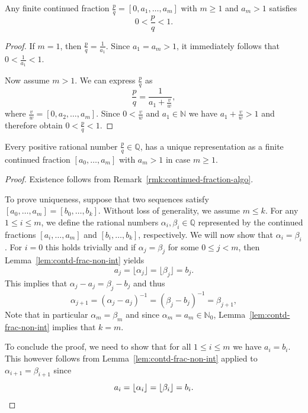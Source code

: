 \documentclass[a4paper, oneside, 12pt]{amsart}
\begin{document}
\begin{lemma}\label{lem:contd-frac-non-int}
  Any finite continued fraction \(\frac{p}{q} =[0, a_1, \dots , a_{m}]\) with \(m \geq 1\) and \(a_{m}>1\) satisfies
  \begin{equation*}
    0 < \frac{p}{q} < 1.
  \end{equation*}
\end{lemma}
\begin{proof}
  If \(m=1\), then \(\frac{p}{q} = \frac{1}{a_1}\).
  Since \(a_1 = a_m > 1\), it immediately follows that \(0 < \frac{1}{a_1} < 1\).

  Now assume \(m > 1\).
  We can express \(\frac{p}{q}\) as
  \begin{equation*}
    \frac{p}{q} = \frac{1}{a_{1} + \frac{v}{w}},
  \end{equation*}
  where \(\frac{v}{w} = [0, a_2, \dots, a_m]\).
  Since \(0 < \frac{v}{w}\) and \(a_{1}\in \mathbb{N}\) we have  \(a_{1}+ \frac{v}{w} > 1\) and therefore obtain \(0 <\frac{p}{q}< 1\).
\end{proof}


\begin{theorem}\label{thm:existence-and-uniqueness}
  Every positive rational number \(\frac{p}{q} \in \mathbb{Q}\), has a unique representation as a  finite continued fraction \([a_{0}, \dots , a_{m}]\)  with \(a_m > 1\) in case \(m \geq 1\).
\end{theorem}
\begin{proof}
  Existence follows from Remark~\ref{rmk:continued-fraction-algo}.

  To prove uniqueness, suppose that two sequences satisfy \([a_0, \dots, a_m] = [b_0, \dots, b_k]\).
  Without loss of generality, we assume \(m \leq k\).
  For any \(1\leq i\leq m\), we define the rational numbers \(\alpha_{i}, \beta_{i}\in \mathbb{Q}\) represented by the continued fractions  \([a_i, \dots, a_m]\) and \( [b_i, \dots, b_k]\), respectively.
  We will now show  that  \(\alpha_i = \beta_i\).
  For \(i=0\) this holds trivially and if \(\alpha_j = \beta_j\) for some \(0\leq j <m\), then Lemma~\ref{lem:contd-frac-non-int} yields
  \begin{equation*}
    a_j = \lfloor \alpha_j \rfloor = \lfloor \beta_j \rfloor = b_j.
  \end{equation*}
  This implies that \(\alpha_j - a_j = \beta_j - b_j\) and thus
  \begin{equation*}
    \alpha_{j+1} = (\alpha_j - a_j)^{-1} = (\beta_j - b_j)^{-1} = \beta_{j+1},
  \end{equation*}
  Note that in particular \(\alpha_{m}= \beta_{m}\) and since \(\alpha_{m}=a_{m}\in \mathbb{N}_{0}\), Lemma~\ref{lem:contd-frac-non-int} implies that \(k=m\).

  To conclude the proof, we need to show that for all \(1\leq i \leq m\) we have  \(a_{i}=b_{i}\).
  This however follows from Lemma~\ref{lem:contd-frac-non-int} applied to \(\alpha_{i+1} = \beta_{i+1}\) since
  \begin{equation*}
    a_{i} = \lfloor \alpha_{i} \rfloor = \lfloor \beta_{i} \rfloor = b_{i}. \qedhere
  \end{equation*}
\end{proof}
\end{document}

